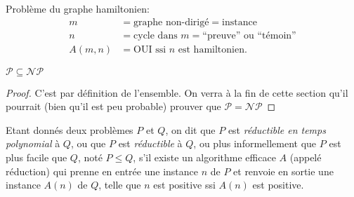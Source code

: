 \begin{myexem}
  Problème du graphe hamiltonien:
  \begin{align*}
    m & = \text{graphe non-dirigé} = \text{instance}\\
    n & = \text{cycle dans }m = \text{``preuve'' ou ``témoin''}\\
    A(m,n) & = \text{OUI ssi }n\text{ est hamiltonien}.
  \end{align*}
\end{myexem}

\begin{mycorr}
  $\mathcal{P} \subseteq \mathcal{NP}$
  \begin{proof}
     C'est par définition de l'ensemble. On verra à la fin de cette section qu'il pourrait (bien qu'il est peu probable) prouver que $\mathcal{P}=\mathcal{NP}$
  \end{proof}
\end{mycorr}

\begin{mydef}
  Etant donnés deux problèmes $P$ et $Q$, on dit que $P$ est \emph{réductible en temps polynomial} à $Q$, ou que $P$ est \emph{réductible} à $Q$, ou plus informellement que $P$ est plus facile que $Q$, noté $P \leq Q$, s’il existe un algorithme efficace $A$ (appelé réduction) qui prenne en entrée une instance $n$ de $P$ et renvoie en sortie une instance $A(n)$ de $Q$, telle que $n$ est positive ssi $A(n)$ est positive.
\end{mydef}

